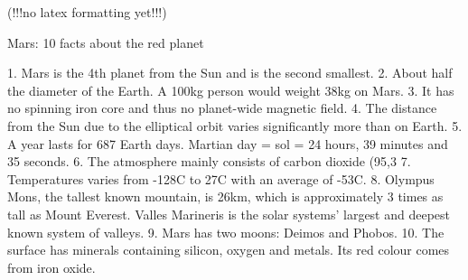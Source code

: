 (!!!no latex formatting yet!!!)

Mars: 10 facts about the red planet

1. Mars is the 4th planet from the Sun and is the second smallest.
2. About half the diameter of the Earth. A 100kg person would weight 38kg on Mars.
3. It has no spinning iron core and thus no planet-wide magnetic field.
4. The distance from the Sun due to the elliptical orbit varies significantly more than on Earth.
5. A year lasts for 687 Earth days. Martian day = sol = 24 hours, 39 minutes and 35 seconds.
6. The atmosphere mainly consists of carbon dioxide (95,3%
7. Temperatures varies from -128C to 27C with an average of -53C.
8. Olympus Mons, the tallest known mountain, is 26km, which is approximately 3 times as tall as Mount Everest. Valles Marineris is the solar systems' largest and deepest known system of valleys.
9. Mars has two moons: Deimos and Phobos.
10. The surface has minerals containing silicon, oxygen and metals. Its red colour comes from iron oxide.